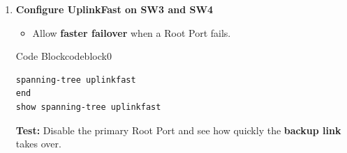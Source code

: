 \documentclass[a4paper]{book}
\begin{document}
\begin{enumerate}


	      \begin{ocg}{Code Block}{codeblock}{0}
		      \vspace{0.5cm}
		      \begin{lstlisting}
spanning-tree vlan 1 forward-time 10
spanning-tree vlan 1 max-age 15
end
show spanning-tree detail
              \end{lstlisting}
	      \end{ocg}



	\item \textbf{Configure UplinkFast on SW3 and SW4}
	\begin{itemize}
        \item Allow \textbf{faster failover} when a Root Port fails.
    \end{itemize}
    


\begin{ocg}{Code Block}{codeblock}{0}
    \vspace{0.5cm}
    \begin{lstlisting}
spanning-tree uplinkfast
end
show spanning-tree uplinkfast
    \end{lstlisting}
\end{ocg}

    
    \textbf{Test:} Disable the primary Root Port and see how quickly the \textbf{backup link} takes over.

\end{enumerate}
\end{document}
